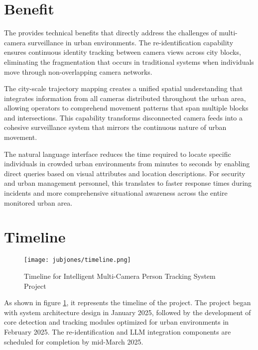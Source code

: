 \newpage

\section{Benefit}
\label{section:benefit}

The \usevar{\srsTitle} provides technical benefits that directly address the challenges of multi-camera surveillance in urban environments. The re-identification capability ensures continuous identity tracking between camera views across city blocks, eliminating the fragmentation that occurs in traditional systems when individuals move through non-overlapping camera networks.

The city-scale trajectory mapping creates a unified spatial understanding that integrates information from all cameras distributed throughout the urban area, allowing operators to comprehend movement patterns that span multiple blocks and intersections. This capability transforms disconnected camera feeds into a cohesive surveillance system that mirrors the continuous nature of urban movement.

The natural language interface reduces the time required to locate specific individuals in crowded urban environments from minutes to seconds by enabling direct queries based on visual attributes and location descriptions. For security and urban management personnel, this translates to faster response times during incidents and more comprehensive situational awareness across the entire monitored urban area.

\section{Timeline}
\label{section:timeline}

\begin{figure}[!htb]
    \centering
    \texttt{[image: jubjones/timeline.png]}
    \caption{Timeline for Intelligent Multi-Camera Person Tracking System Project}
    \label{fig:timeline}
\end{figure}

As shown in figure \ref{fig:timeline}, it represents the timeline of the project.
The project began with system architecture design in January 2025, followed by the development of core detection
and tracking modules optimized for urban environments in February 2025. The re-identification and LLM integration components are scheduled for
completion by mid-March 2025.

